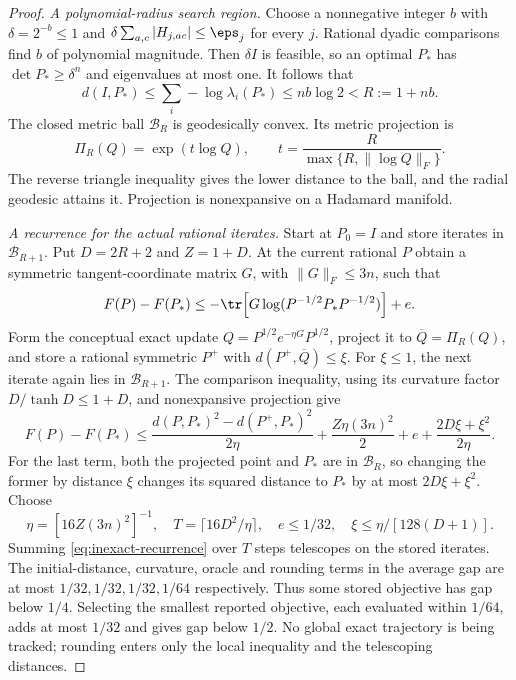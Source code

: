 \begin{proof}
\emph{A polynomial-radius search region.} Choose a nonnegative integer
$b$ with $\delta=2^{-b}\le1$ and
$\delta\sum_{a,c}|H_{j,ac}|\le\eps_j$ for every $j$. Rational dyadic
comparisons find $b$ of polynomial magnitude. Then $\delta I$ is feasible,
so an optimal $P_*$ has $\det P_*\ge\delta^n$ and eigenvalues at most
one. It follows that
\[
 d(I,P_*)\le\sum_i-\log\lambda_i(P_*)\le nb\log2<R:=1+nb.
\]
The closed metric ball $\mathcal B_R$ is geodesically convex. Its metric
projection is
\begin{equation}\label{eq:radial-projection}
 \Pi_R(Q)=\exp(t\log Q),\qquad
 t=\frac{R}{\max\{R,\|\log Q\|_F\}}.
\end{equation}
The reverse triangle inequality gives the lower distance to the ball,
and the radial geodesic attains it. Projection is nonexpansive on a
Hadamard manifold.

\emph{A recurrence for the actual rational iterates.} Start at $P_0=I$
and store iterates in $\mathcal B_{R+1}$. Put $D=2R+2$ and $Z=1+D$.
At the current rational $P$ obtain a symmetric tangent-coordinate matrix
$G$, with $\|G\|_F\le3n$, such that
\begin{equation}\label{eq:inexact-subgradient}
 F(P)-F(P_*)\le-\tr\!\left[G\log(P^{-1/2}P_*P^{-1/2})\right]+e.
\end{equation}
Form the conceptual exact update
$Q=P^{1/2}e^{-\eta G}P^{1/2}$, project it to $\overline Q=\Pi_R(Q)$,
and store a rational symmetric $P^+$ with $d(P^+,\overline Q)\le\xi$.
For $\xi\le1$, the next iterate again lies in $\mathcal B_{R+1}$.
The comparison inequality, using its curvature factor
$D/\tanh D\le1+D$, and nonexpansive projection give
\begin{equation}\label{eq:inexact-recurrence}
 F(P)-F(P_*)\le
 \frac{d(P,P_*)^2-d(P^+,P_*)^2}{2\eta}
 +\frac{Z\eta(3n)^2}{2}+e+\frac{2D\xi+\xi^2}{2\eta}.
\end{equation}
For the last term, both the projected point and $P_*$ are in
$\mathcal B_R$, so changing the former by distance $\xi$ changes its
squared distance to $P_*$ by at most $2D\xi+\xi^2$.
Choose
\[
 \eta=[16Z(3n)^2]^{-1},\quad
 T=\lceil16D^2/\eta\rceil,\quad e\le1/32,\quad
 \xi\le\eta/[128(D+1)].
\]
Summing \eqref{eq:inexact-recurrence} over $T$ steps telescopes on the
stored iterates. The initial-distance, curvature, oracle and rounding
terms in the average gap are at most $1/32,1/32,1/32,1/64$ respectively.
Thus some stored objective has gap below $1/4$. Selecting the smallest
reported objective, each evaluated within $1/64$, adds at most $1/32$
and gives gap below $1/2$. No global exact trajectory is being tracked;
rounding enters only the local inequality and the telescoping distances.


\end{proof}
